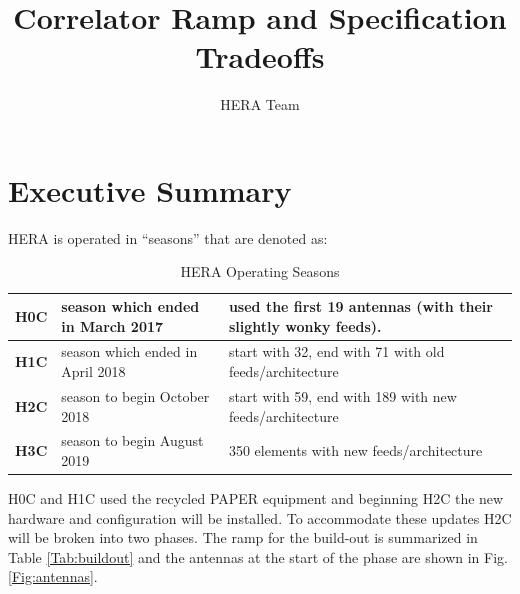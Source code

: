 \documentclass{article}
\begin{document}
\author{HERA Team}
\title{Correlator Ramp and Specification Tradeoffs}
\maketitle

\setcounter{section}{-1}
\section*{Executive Summary}
HERA is operated in ``seasons'' that are denoted as:

\vspace{-0.25in}
\begin{table}[H]
\caption{HERA Operating Seasons \label{Tab:seasons}}
\begin{tabular}{p{0.5in} p{2.2in} p{3.5in}} \hline
{\bf H0C} & season which ended in March 2017 & used the first 19 antennas (with their slightly wonky feeds). \\ \hline
{\bf H1C} & season which ended in April 2018    & start with 32, end with 71 with old feeds/architecture\\ \hline
{\bf H2C} & season to begin October 2018         & start with 59, end with 189 with new feeds/architecture\\ \hline
{\bf H3C} & season to begin August 2019           & 350 elements with new feeds/architecture \\ \hline
\end{tabular}
\end{table}

H0C and H1C used the recycled PAPER equipment and beginning H2C the new hardware and configuration will be installed.  To accommodate these updates H2C will be broken into two phases.  
The ramp for the build-out is summarized in Table \ref{Tab:buildout} and the antennas at the start of the phase are shown in Fig. \ref{Fig:antennas}.
\end{document}
